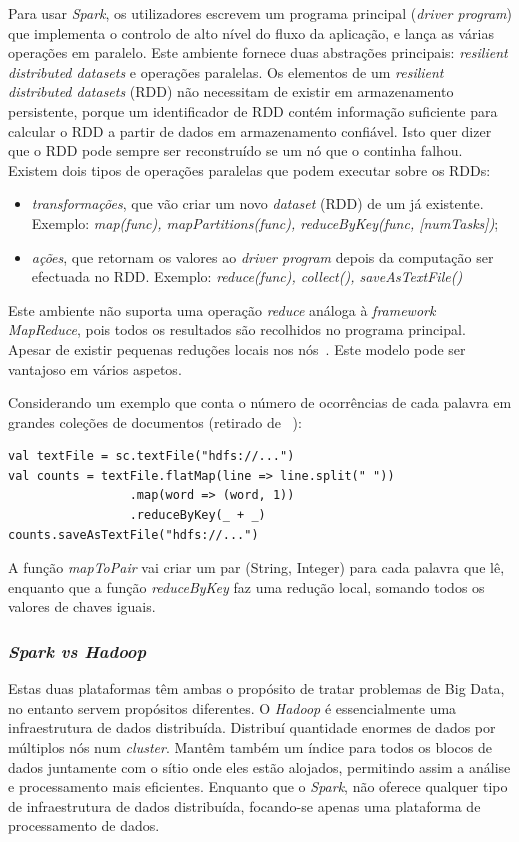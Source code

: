 Para usar \textit{Spark}, os utilizadores escrevem um programa principal (\textit{driver program}) que implementa o controlo de alto nível do fluxo da aplicação, e lança as várias operações em paralelo. Este ambiente fornece duas abstrações principais: \textit{resilient distributed datasets} e operações paralelas. 
Os elementos de um \textit{resilient distributed datasets} (RDD) não necessitam de existir em armazenamento persistente, porque um identificador de RDD contém informação suficiente para calcular o RDD a partir de dados em armazenamento confiável. Isto quer dizer que o RDD pode sempre ser reconstruído se um nó que o continha falhou.
Existem dois tipos de operações paralelas que podem executar sobre os RDDs:
\begin{itemize}
    \item \textit{transformações}, que vão criar um novo \textit{dataset} (RDD) de um já existente. Exemplo: \textit{map(func), mapPartitions(func), reduceByKey(func, [numTasks])};
    \item \textit{ações}, que retornam os valores ao \textit{driver program} depois da computação ser efectuada no RDD. Exemplo: \textit{reduce(func), collect(), saveAsTextFile()}
\end{itemize}

Este ambiente não suporta uma operação \textit{reduce} análoga à \textit{framework MapReduce}, pois todos os resultados são recolhidos no programa principal. Apesar de existir pequenas reduções locais nos nós~\cite{zaharia2010spark}. Este modelo pode ser vantajoso em vários aspetos.

Considerando um exemplo que conta o número de ocorrências de cada palavra em grandes coleções de documentos (retirado de ~\cite{apacheSparKExample}):
\begin{lstlisting}
val textFile = sc.textFile("hdfs://...")
val counts = textFile.flatMap(line => line.split(" "))
                 .map(word => (word, 1))
                 .reduceByKey(_ + _)
counts.saveAsTextFile("hdfs://...")
\end{lstlisting}

A função \textit{mapToPair} vai criar um par (String, Integer) para cada palavra que lê, enquanto que a função \textit{reduceByKey} faz uma redução local, somando todos os valores de chaves iguais.

\subsubsection{\textit{Spark vs \textit{Hadoop}}}
Estas duas plataformas têm ambas o propósito de tratar problemas de Big Data, no entanto servem propósitos diferentes. O \textit{Hadoop} é essencialmente uma infraestrutura de dados distribuída. Distribuí quantidade enormes de dados por múltiplos nós num \textit{cluster}. Mantêm também um índice para todos os blocos de dados juntamente com o sítio onde eles estão alojados, permitindo assim a análise e processamento mais eficientes. Enquanto que o \textit{Spark}, não oferece qualquer tipo de infraestrutura de dados distribuída, focando-se apenas uma plataforma de processamento de dados. 

